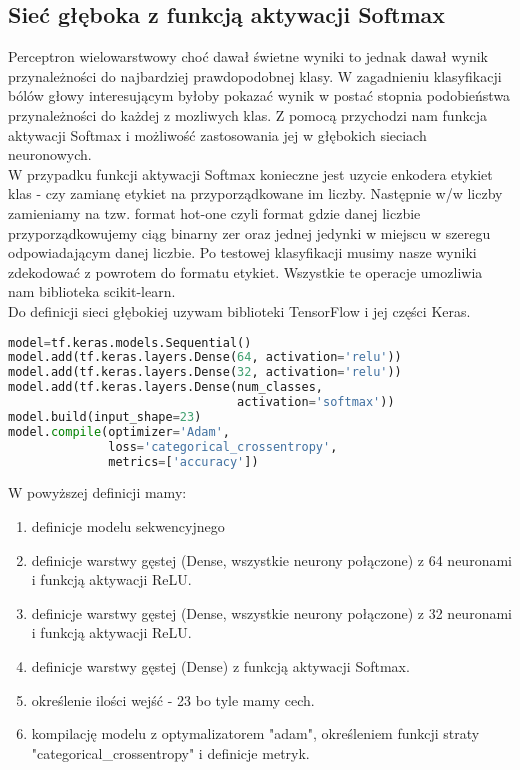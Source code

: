 \subsection{Sieć głęboka z funkcją aktywacji Softmax}
Perceptron wielowarstwowy choć dawał świetne wyniki to jednak dawał wynik przynależności do najbardziej prawdopodobnej klasy. W zagadnieniu klasyfikacji bólów głowy interesującym byłoby pokazać wynik w postać stopnia podobieństwa przynależności do każdej z mozliwych klas. Z pomocą przychodzi nam funkcja aktywacji Softmax i możliwość zastosowania jej w głębokich sieciach neuronowych.\\

W przypadku funkcji aktywacji Softmax konieczne jest uzycie enkodera etykiet klas - czy zamianę etykiet na przyporządkowane im liczby. Następnie w/w liczby zamieniamy na tzw. format hot-one czyli format gdzie danej liczbie przyporządkowujemy ciąg binarny zer oraz jednej jedynki w miejscu w szeregu odpowiadającym danej liczbie. Po testowej klasyfikacji musimy nasze wyniki zdekodować z powrotem do formatu etykiet. Wszystkie te operacje umozliwia nam biblioteka scikit-learn.\\

Do definicji sieci głębokiej uzywam biblioteki TensorFlow i jej części Keras.
\begin{lstlisting}[language=Python, caption=Definicja sieci głębokiej z funkcją aktywacji Softmax]
model=tf.keras.models.Sequential()
model.add(tf.keras.layers.Dense(64, activation='relu'))
model.add(tf.keras.layers.Dense(32, activation='relu'))
model.add(tf.keras.layers.Dense(num_classes, 
                                activation='softmax'))
model.build(input_shape=23)
model.compile(optimizer='Adam',
              loss='categorical_crossentropy',
              metrics=['accuracy'])
\end{lstlisting}

W powyższej definicji mamy:
\begin{enumerate}
    \item definicje modelu sekwencyjnego
    \item definicje warstwy gęstej (Dense, wszystkie neurony połączone) z 64 neuronami i funkcją aktywacji ReLU.
    \item definicje warstwy gęstej (Dense, wszystkie neurony połączone) z 32 neuronami i funkcją aktywacji ReLU. 
    \item definicje warstwy gęstej (Dense) z funkcją aktywacji Softmax.
    \item określenie ilości wejść - 23 bo tyle mamy cech.
    \item kompilację modelu z optymalizatorem "adam", określeniem funkcji straty "categorical\_crossentropy" i definicje metryk.
\end{enumerate}


